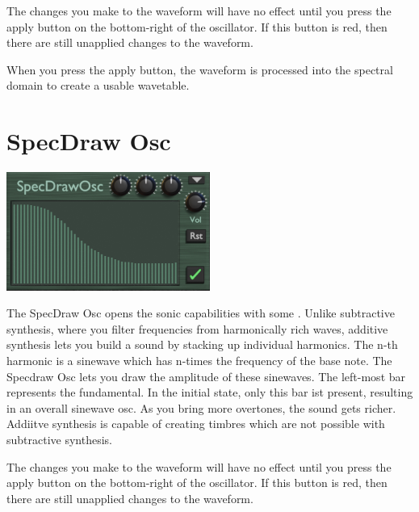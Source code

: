 \begin{tcolorbox}[colback=yellow!10!white,
        colframe=white!20!black,
        center,
        valign=top,
        halign=left,
        center title,
        width=\textwidth]

    The changes you make to the waveform will have no effect until you press the apply button on the bottom-right of the oscillator. If this button is red, then there are still unapplied changes to the waveform.
\end{tcolorbox}

When you press the apply button, the waveform is processed into the spectral domain to create a usable wavetable.

\section{SpecDraw Osc}
\begin{center}
    \includegraphics[width=0.5\textwidth]{graphics/specdraw_osc.png}
\end{center}
The SpecDraw Osc opens the sonic capabilities with some . Unlike subtractive synthesis, where you filter frequencies from harmonically rich waves, additive synthesis lets you build a sound by stacking up individual harmonics. The n-th harmonic is a sinewave which has n-times the frequency of the base note. The Specdraw Osc lets you draw the amplitude of these sinewaves. The left-most bar represents the fundamental. In the initial state, only this bar ist present, resulting in an overall sinewave osc. As you bring more overtones, the sound gets richer. Addiitve synthesis is capable of creating timbres which are not possible with subtractive synthesis.

\begin{tcolorbox}[colback=yellow!10!white,
        colframe=white!20!black,
        center,
        valign=top,
        halign=left,
        center title,
        width=\textwidth]

    The changes you make to the waveform will have no effect until you press the apply button on the bottom-right of the oscillator. If this button is red, then there are still unapplied changes to the waveform.
\end{tcolorbox}